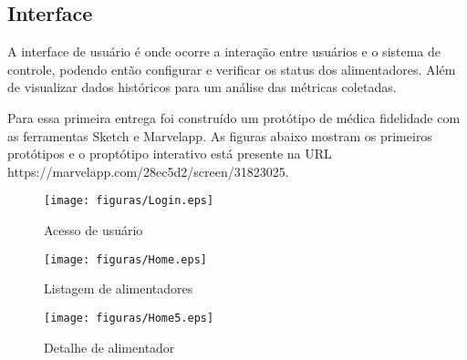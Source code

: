 \subsection{Interface}

A interface de usuário é onde ocorre a interação entre usuários e o sistema de controle, podendo então configurar e verificar os status dos alimentadores. Além de visualizar dados históricos para um análise das métricas coletadas.

Para essa primeira entrega foi construído um protótipo de médica fidelidade com as ferramentas Sketch e Marvelapp. As figuras abaixo mostram os primeiros protótipos e o proptótipo interativo está presente na URL https://marvelapp.com/28ec5d2/screen/31823025.

\begin{sidewaysfigure}
\begin{figure}[H]
 \centering
   \texttt{[image: figuras/Login.eps]}
 \caption{Acesso de usuário}
 \label{login}
\end{figure}
\end{sidewaysfigure}

\begin{sidewaysfigure}
\begin{figure}[H]
 \centering
   \texttt{[image: figuras/Home.eps]}
 \caption{Listagem de alimentadores}
 \label{home1}
\end{figure}
\end{sidewaysfigure}

\begin{sidewaysfigure}
\begin{figure}[H]
 \centering
   \texttt{[image: figuras/Home5.eps]}
 \caption{Detalhe de alimentador}
 \label{home2}
\end{figure}
\end{sidewaysfigure}
